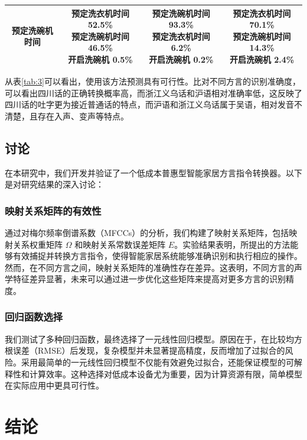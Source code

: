 \documentclass[lang=cn,cite=super]{elegantpaper}
\begin{document}
\begin{table}[h]
\begin{center}
\begin{tabular}{cccc}
            预定洗碗机时间 & \makecell{预定洗衣机时间 52.5\% \\ 预定洗碗机时间 46.5\% \\ 开启洗碗机 0.5\%} & \makecell{预定洗碗机时间 93.3\% \\ 预定洗衣机时间 6.2\% \\ 开启洗碗机 0.2\%} & \makecell{预定洗衣机时间 70.1\% \\ 预定洗碗机时间 14.3\% \\ 开启洗碗机 2.4\%}\\
            \bottomrule
        \end{tabular}
    \end{center}
\end{table}

从表\ref{tab:3}可以看出，使用该方法预测具有可行性。比对不同方言的识别准确度，可以看出四川话的正确转换概率高，而浙江义乌话和沪语相对准确率低，这反映了四川话的吐字更为接近普通话的特点，而沪语和浙江义乌话属于吴语，相对发音不清楚，且存在入声、变声等特点。
\subsection{讨论}
在本研究中，我们开发并验证了一个低成本普惠型智能家居方言指令转换器。以下是对研究结果的深入讨论：

\subsubsection{映射关系矩阵的有效性}

通过对梅尔频率倒谱系数（MFCCs）的分析，我们构建了映射关系矩阵，包括映射关系权重矩阵 \( \Omega \) 和映射关系常数误差矩阵 \( E \)。实验结果表明，所提出的方法能够有效捕捉并转换方言指令，使得智能家居系统能够准确识别和执行相应的操作。然而，在不同方言之间，映射关系矩阵的准确性存在差异。这表明，不同方言的声学特征差异显著，未来可以通过进一步优化这些矩阵来提高对更多方言的识别精度。

\subsubsection{回归函数选择}

我们测试了多种回归函数，最终选择了一元线性回归模型。原因在于，在比较均方根误差（RMSE）后发现，复杂模型并未显著提高精度，反而增加了过拟合的风险。采用最简单的一元线性回归模型不仅能有效避免过拟合，还能保证模型的可解释性和计算效率。这种选择对低成本设备尤为重要，因为计算资源有限，简单模型在实际应用中更具可行性。

\section{结论}
\end{document}
